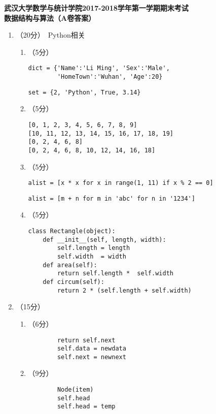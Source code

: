 \documentclass[8pt]{article}
\newlength{\la}
\begin{document}
\begin{CJK}{UTF8}{gkai}
\begin{center}
{\Large \bf  武汉大学数学与统计学院2017-2018学年第一学期期末考试\\[0.1in]
  数据结构与算法（A卷答案）} \vspace{0.1in}

\end{center}


\begin{enumerate} %
\item （20分）~Python相关
  \begin{enumerate}
  \item （5分）
    \begin{lstlisting}
dict = {'Name':'Li Ming', 'Sex':'Male', 
        'HomeTown':'Wuhan', 'Age':20}
    \end{lstlisting}
    \begin{lstlisting}
set = {2, 'Python', True, 3.14}
     \end{lstlisting}
  \item （5分）
    \begin{lstlisting}
[0, 1, 2, 3, 4, 5, 6, 7, 8, 9]
[10, 11, 12, 13, 14, 15, 16, 17, 18, 19]
[0, 2, 4, 6, 8]
[0, 2, 4, 6, 8, 10, 12, 14, 16, 18]
    \end{lstlisting}
  \item （5分）
\begin{lstlisting}
alist = [x * x for x in range(1, 11) if x % 2 == 0]
  \end{lstlisting}
  \begin{lstlisting}
alist = [m + n for m in 'abc' for n in '1234']
  \end{lstlisting}
\item （5分）
  \begin{lstlisting}
class Rectangle(object):
    def __init__(self, length, width):
        self.length = length
        self.width  = width
    def area(self):
        return self.length *  self.width
    def circum(self):
        return 2 * (self.length + self.width)
  \end{lstlisting}    
  \end{enumerate}
\item （15分）~
  \begin{enumerate}
    \item （6分）
      \begin{lstlisting}
        return self.next
        self.data = newdata
        self.next = newnext
      \end{lstlisting}
    \item （9分）
      \begin{lstlisting}
        Node(item)
        self.head
        self.head = temp


\end{lstlisting}
\end{enumerate}
\end{enumerate}
\end{CJK}
\end{document}
